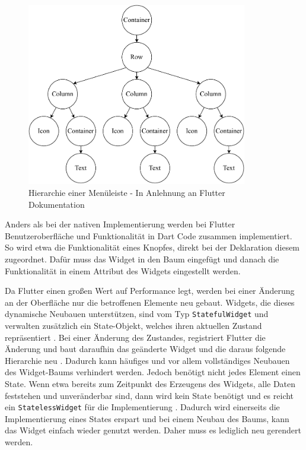 \begin{figure}[ht]
  \centering
  \includegraphics[height=8cm,keepaspectratio]{images/Flutter_menu_replacement.drawio.pdf} 
  \caption[Hierarchie einer Menüleiste]{Hierarchie einer Menüleiste - In Anlehnung an Flutter Dokumentation\protect\footnotemark}
  \label{fig:flutter_layout_tree}
\end{figure}

Anders als bei der nativen Implementierung werden bei Flutter Benutzeroberfläche und Funktionalität in Dart Code zusammen implementiert. So wird etwa die Funktionalität eines Knopfes, direkt bei der Deklaration diesem zugeordnet. Dafür muss das Widget in den Baum eingefügt und danach die Funktionalität in einem Attribut des Widgets eingestellt werden.

Da Flutter einen großen Wert auf Performance legt, werden bei einer Änderung an der Oberfläche nur die betroffenen Elemente neu gebaut. Widgets, die dieses dynamische Neubauen unterstützen, sind vom Typ \verb|StatefulWidget| und verwalten zusätzlich ein State-Objekt, welches ihren aktuellen Zustand repräsentiert \cite[Kapitel~4]{Flutter_Recipes}. Bei einer Änderung des Zustandes, registriert Flutter die Änderung und baut daraufhin das geänderte Widget und die daraus folgende Hierarchie neu \cite{9623025}. Dadurch kann häufiges und vor allem vollständiges Neubauen des Widget-Baums verhindert werden. Jedoch benötigt nicht jedes Element einen State. Wenn etwa bereits zum Zeitpunkt des Erzeugens des Widgets, alle Daten feststehen und unveränderbar sind, dann wird kein State benötigt und es reicht ein \verb|StatelessWidget| für die Implementierung \cite[Kapitel~4]{Flutter_Recipes}. Dadurch wird einerseits die Implementierung eines States erspart und bei einem Neubau des Baums, kann das Widget einfach wieder genutzt werden. Daher muss es lediglich neu gerendert werden.

